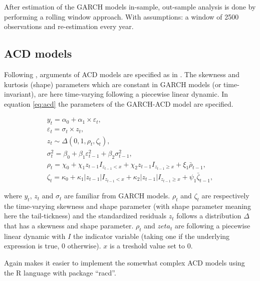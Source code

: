 \documentclass[a4paper, nobind]{templates/ociamthesis}
\begin{document}
\noindent After estimation of the GARCH models in-sample, out-sample analysis is done by performing a rolling window approach. With assumptions: a window of 2500 observations and re-estimation every year.

\hypertarget{acd-models-meth}{%
\subsection{ACD models}\label{acd-models-meth}}

\noindent Following \textcite{ghalanos2016}, arguments of ACD models are specified as in \textcite{hansen1994}. The skewness and kurtosis (shape) parameters which are constant in GARCH models (or time-invariant), are here time-varying following a piecewise linear dynamic. In equation \eqref{eq:acd} the parameters of the GARCH-ACD model are specified.

\begin{equation}
\begin{array}{l}
y_{t}=\alpha_0 + \alpha_1 \times \varepsilon_{t}, \\
\varepsilon_{t}= \sigma_{t} \times z_{t}, \\
z_{t} \sim \Delta\left(0,1, \rho_{t}, \zeta_{t}\right), \\
\sigma_{t}^{2}=\beta_0+\beta_{1} \varepsilon_{t-1}^{2}+\beta_{2} \sigma_{t-1}^{2}, \\
\rho_{t}= \chi_{0}+\chi_{1} z_{t-1} I_{z_{t-1}<x}+\chi_{2} z_{t-1} I_{z_{t-1} \geqslant x}+\xi_{1} \bar{\rho}_{t-1},\\
\zeta_{t}=\kappa_{0}+\kappa_{1}\left|z_{t-1}\right| I_{z_{t-1}<x}+\kappa_{2}\left|z_{t-1}\right| I_{z_{t-1} \geqslant x}+\psi_{1} \bar{\zeta}_{t-1},
\end{array}
\label{eq:acd}
\end{equation}

\noindent where \(y_t\), \(z_t\) and \(\sigma_t\) are familiar from GARCH models. \(\rho_t\) and \(\zeta_t\) are respectively the time-varying skewness and shape parameter (with shape parameter meaning here the tail-tickness) and the standardized residuals \(z_t\) follows a distribution \(\Delta\) that has a skewness and shape parameter. \(\rho_t\) and \(zeta_t\) are following a piecewise linear dynamic with \(I\) the indicator variable (taking one if the underlying expression is true, 0 otherwise). \(x\) is a treshold value set to 0.

\noindent Again \textcite{ghalanos2016} makes it easier to implement the somewhat complex ACD models using the R language with package ``racd''.
\end{document}
